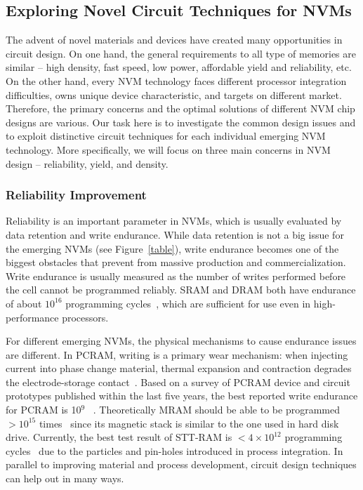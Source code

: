 
\subsection{Exploring Novel Circuit Techniques for NVMs}
The advent of novel materials and devices have created many opportunities in circuit design. On one hand, the general requirements to all type of memories are similar -- high density, fast speed, low power, affordable yield and reliability, etc. On the other hand, every NVM technology faces different processor integration difficulties,  owns unique device characteristic, and targets on different market. Therefore, the primary concerns and the optimal solutions of different NVM chip designs are various. Our task here is to investigate the common design issues and to exploit distinctive circuit techniques for each individual emerging NVM technology. More specifically, we will focus on three main concerns in NVM design -- reliability, yield, and density.

\subsubsection{Reliability Improvement}
Reliability is an important parameter in NVMs, which is usually evaluated by data retention and write endurance. While data retention is not a big issue for the emerging NVMs (see Figure~\ref{table}), write endurance becomes one of the biggest obstacles that prevent from massive production and commercialization. Write endurance is usually measured as the number of writes performed before the cell cannot be programmed reliably. SRAM and DRAM both have endurance of about $10^{16}$ programming cycles~\cite{ITRS07}, which are sufficient for use even in high-performance processors.

For different emerging NVMs, the physical mechanisms to cause endurance issues are different. In PCRAM, writing is a primary wear mechanism: when injecting current into phase change material, thermal expansion and contraction degrades the electrode-storage contact~\cite{Lee09}. Based on a survey of PCRAM device and circuit prototypes published within the last five years, the best reported write endurance for PCRAM is 10$^9$ ~\cite{Lee09}. Theoretically MRAM should be able to be programmed $>10^{15}$ times~\cite{ITRS07} since its magnetic stack is similar to the one used in hard disk drive. Currently, the best test result of STT-RAM is $<4\times10^{12}$ programming cycles~\cite{Diao07} due to the particles and pin-holes introduced in process integration. In parallel to improving material and process development, circuit design techniques can help out in many ways.

